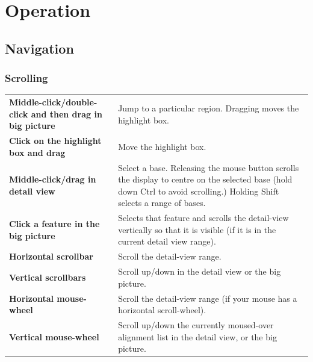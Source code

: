 \documentclass[letterpaper]{article}
\begin{document}
{\color[rgb]{0.0,0.27058825,0.5254902}\section[Operation]{Operation}}
{\color[rgb]{0.30980393,0.5058824,0.7411765}\hypertarget{RefHeading1821056909880}{}\subsection[Navigation]{Navigation}}
{\color[rgb]{0.30980393,0.5058824,0.7411765}\hypertarget{RefHeading1841056909880}{}\subsubsection[Scrolling]{Scrolling}}
\hypertarget{RefHeading1861056909880}{}\begin{flushleft}
\tablehead{}
\begin{supertabular}{p{4.15cm}p{10.436cm}}

{\bfseries Middle-click/double-click and then drag in big picture}
 &
 Jump to a particular region. Dragging moves the highlight box.
\\

{\bfseries Click on the highlight box and drag}
 &
 Move the highlight box.
\\

{\bfseries Middle-click/drag in detail view}
 &
 Select a base. Releasing the mouse button scrolls the display to centre on the selected base (hold down Ctrl to avoid scrolling.) Holding Shift selects a range of bases.
\\

\bfseries Click a feature in the big picture 
&
{ Selects that feature and scrolls the
detail-view vertically so that it is visible (if it is in the current
detail view range).}
\\

{\bfseries Horizontal scrollbar}
 &
 Scroll the detail-view range.
\\

{\bfseries Vertical scrollbars}
 &
 Scroll up/down in the detail view or the big
picture.
\\

{\bfseries Horizontal mouse-wheel}
 &
{ Scroll the detail-view range (if your mouse
has a horizontal scroll-wheel).}
\\

{\bfseries Vertical mouse-wheel}
 &
{ Scroll up/down the currently moused-over
alignment list in the detail view, or the big picture.}
\\


\end{supertabular}
\end{flushleft}
\end{document}
